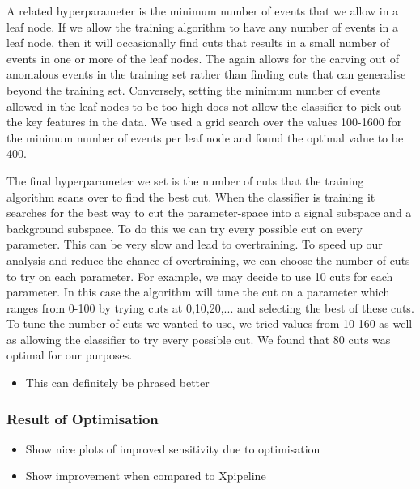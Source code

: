 \documentclass[12pt,twoside,a4paper]{report}
\begin{document}
A related hyperparameter is the minimum number of events that we allow in a leaf node. If we allow the training algorithm to have any number of events in a leaf node, then it will occasionally find cuts that results in a small number of events in one or more of the leaf nodes. The again allows for the carving out of anomalous events in the training set rather than finding cuts that can generalise beyond the training set. Conversely, setting the minimum number of events allowed in the leaf nodes to be too high does not allow the classifier to pick out the key features in the data. We used a grid search over the values 100-1600 for the minimum number of events per leaf node and found the optimal value to be 400. 

The final hyperparameter we set is the number of cuts that the training algorithm scans over to find the best cut. When the classifier is training it searches for the best way to cut the parameter-space into a signal subspace and a background subspace. To do this we can try every possible cut on every parameter. This can be very slow and lead to overtraining. To speed up our analysis and reduce the chance of overtraining, we can choose the number of cuts to try on each parameter. For example, we may decide to use 10 cuts for each parameter. In this case the algorithm will tune the cut on a parameter which ranges from 0-100 by trying cuts at 0,10,20,... and selecting the best of these cuts. To tune the number of cuts we wanted to use, we tried values from 10-160 as well as allowing the classifier to try every possible cut. We found that 80 cuts was optimal for our purposes. 

\begin{itemize}
\item This can definitely be phrased better
\end{itemize}

\subsubsection{Result of Optimisation}
\begin{itemize}
\item Show nice plots of improved sensitivity due to optimisation
\item Show improvement when compared to Xpipeline
\end{itemize}
\end{document}
